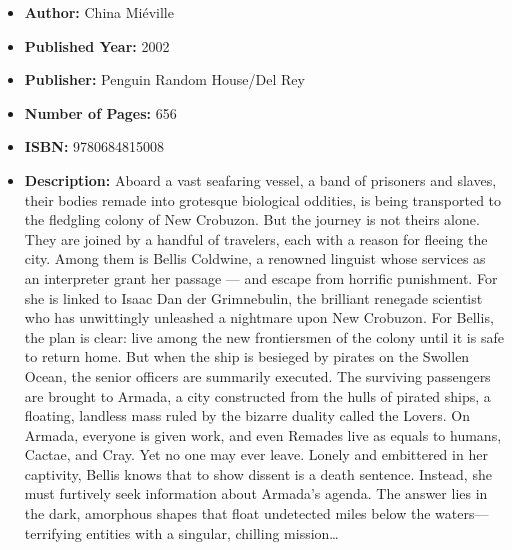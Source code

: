 \documentclass{tufte-handout}
\begin{document}
\begin{itemize}
    \item[] \textbf{Author:} China Miéville
    \item[] \textbf{Published Year:} 2002  
    \item[] \textbf{Publisher:} Penguin Random House/Del Rey
    \item[] \textbf{Number of Pages:} 656      
    \item[] \textbf{ISBN:} 9780684815008
    \item[] \textbf{Description:} Aboard a vast seafaring vessel, a band of prisoners and slaves, their bodies remade into grotesque biological oddities, is being transported to the fledgling colony of New Crobuzon. But the journey is not theirs alone. They are joined by a handful of travelers, each with a reason for fleeing the city. Among them is Bellis Coldwine, a renowned linguist whose services as an interpreter grant her passage --- and escape from horrific punishment. For she is linked to Isaac Dan der Grimnebulin, the brilliant renegade scientist who has unwittingly unleashed a nightmare upon New Crobuzon. For Bellis, the plan is clear: live among the new frontiersmen of the colony until it is safe to return home. But when the ship is besieged by pirates on the Swollen Ocean, the senior officers are summarily executed. The surviving passengers are brought to Armada, a city constructed from the hulls of pirated ships, a floating, landless mass ruled by the bizarre duality called the Lovers. On Armada, everyone is given work, and even Remades live as equals to humans, Cactae, and Cray. Yet no one may ever leave. Lonely and embittered in her captivity, Bellis knows that to show dissent is a death sentence. Instead, she must furtively seek information about Armada’s agenda. The answer lies in the dark, amorphous shapes that float undetected miles below the waters—terrifying entities with a singular, chilling mission\ldots
\end{itemize}
\end{document}
